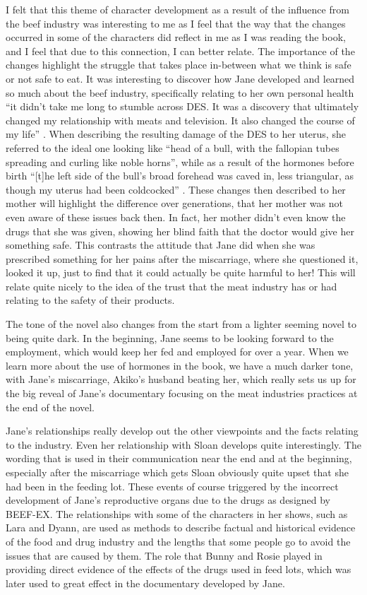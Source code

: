 \documentclass{article}
\begin{document}
I felt that this theme of character development as a result of the influence
from the beef industry was interesting to me as I feel that the way that the
changes occurred in some of the characters did reflect in me as I was
reading the book, and I feel that due to this connection, I can better
relate. The importance of the changes highlight the struggle that takes
place in-between what we think is safe or not safe to eat. It was
interesting to discover how Jane developed and learned so much about the
beef industry, specifically relating to her own personal health ``it
didn't take me long to stumble across DES. It was a discovery that
ultimately changed my relationship with meats and television. It also
changed the course of my life'' \cite{ozeki1998my}. When describing the
resulting damage of the DES to her uterus, she referred to the ideal one
looking like ``head of a bull, with the fallopian tubes spreading and
curling like noble horns'', while as a result of the hormones before birth
``[t]he left side of the bull’s broad forehead was caved in, less
triangular, as though my uterus had been coldcocked'' \cite{ozeki1998my}.
These changes then described to her mother will highlight the difference
over generations, that her mother was not even aware of these issues back
then. In fact, her mother didn't even know the drugs that she was given,
showing her blind faith that the doctor would give her something safe. This
contrasts the attitude that Jane did when she was prescribed something for
her pains after the miscarriage, where she questioned it, looked it up, just
to find that it could actually be quite harmful to her! This will relate
quite nicely to the idea of the trust that the meat industry has or had
relating to the safety of their products.

The tone of the novel also changes from the start from a lighter seeming
novel to being quite dark. In the beginning, Jane seems to be looking
forward to the employment, which would keep her fed and employed for over a
year. When we learn more about the use of hormones in the book, we have a
much darker tone, with Jane's miscarriage, Akiko's husband beating her,
which really sets us up for the big reveal of Jane's documentary focusing on
the meat industries practices at the end of the novel.

Jane's relationships really develop out the other viewpoints and the facts
relating to the industry. Even her relationship with Sloan develops quite
interestingly. The wording that is used in their communication near the end
and at the beginning, especially after the miscarriage which gets Sloan
obviously quite upset that she had been in the feeding lot. These events of
course triggered by the incorrect development of Jane's reproductive organs
due to the drugs as designed by BEEF-EX. The relationships with some of the
characters in her shows, such as Lara and Dyann, are used as methods to
describe factual and historical evidence of the food and drug industry and
the lengths that some people go to avoid the issues that are caused by them.
The role that Bunny and Rosie played in providing direct evidence of the
effects of the drugs used in feed lots, which was later used to great effect
in the documentary developed by Jane.
\end{document}
